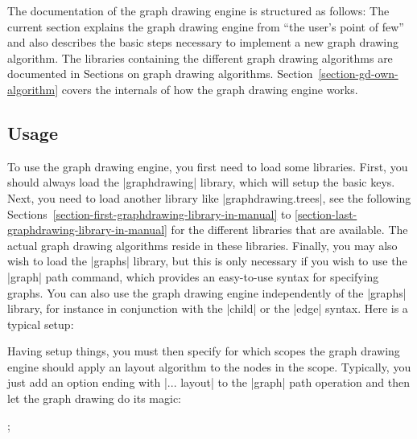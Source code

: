 The documentation of the graph drawing engine is structured as
follows: The current section explains the graph drawing engine from
``the user's point of few'' and also describes the basic steps
necessary to implement a new graph drawing algorithm. The libraries
containing the different graph drawing algorithms are documented in
Sections on graph drawing
algorithms. Section~\ref{section-gd-own-algorithm} covers the
internals of how the graph drawing engine works. 


\subsection{Usage}

To use the graph drawing engine, you first need to load some
libraries. First, you should always load the |graphdrawing| library,
which will setup the basic keys. Next, you need to load another
library like |graphdrawing.trees|, see the following
Sections~\ref{section-first-graphdrawing-library-in-manual} to
\ref{section-last-graphdrawing-library-in-manual} for the different
libraries that are available. The actual graph drawing
algorithms reside in these libraries. Finally, you may also wish to
load the |graphs| library, but this is only necessary if you wish to
use the |graph| path command, which provides an easy-to-use syntax for
specifying graphs. You can also use the graph drawing engine
independently of the |graphs| library, for instance in conjunction
with the |child| or the |edge| syntax. Here is a typical setup:

\begin{codeexample}
\usetikzlibrary{graphs,graphdrawing,graphdrawing.trees}  
\end{codeexample}

Having setup things, you must then specify for which scopes the
graph drawing engine should apply an layout algorithm to the nodes in
the scope. Typically, you just add an option ending with |... layout|
to the |graph| path operation and then let the graph drawing do its
magic:

\begin{codeexample}[]
  ;    
\end{codeexample}

